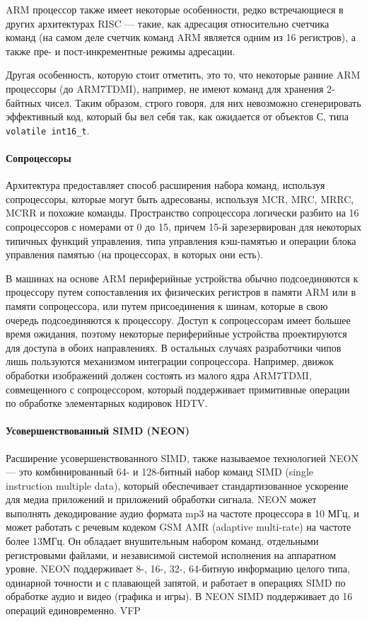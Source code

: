 ARM процессор также имеет некоторые особенности, редко встречающиеся в 
других архитектурах RISC — такие, как адресация относительно счетчика 
команд (на самом деле счетчик команд ARM является одним из 16 регистров), 
а также пре- и пост-инкрементные режимы адресации.

Другая особенность, которую стоит отметить, это то, что некоторые ранние 
ARM процессоры (до ARM7TDMI), например, не имеют команд для хранения 
2-байтных чисел. Таким образом, строго говоря, для них невозможно 
сгенерировать эффективный код, который бы вел себя так, как ожидается от 
объектов С, типа \verb|volatile int16_t|.

\paragraph{Сопроцессоры}

Архитектура предоставляет способ расширения набора команд, используя 
сопроцессоры, которые могут быть адресованы, используя MCR, MRC, MRRC, 
MCRR и похожие команды. Пространство сопроцессора логически разбито на 16 
сопроцессоров с номерами от 0 до 15, причем 15-й зарезервирован для 
некоторых типичных функций управления, типа управления кэш-памятью и 
операции блока управления памятью (на процессорах, в которых они есть).

В машинах на основе ARM периферийные устройства обычно подсоединяются к 
процессору путем сопоставления их физических регистров в памяти ARM или в 
памяти сопроцессора, или путем присоединения к шинам, которые в свою очередь 
подсоединяются к процессору. Доступ к сопроцессорам имеет большее время 
ожидания, поэтому некоторые периферийные устройства проектируются для 
доступа в обоих направлениях. В остальных случаях разработчики чипов лишь 
пользуются механизмом интеграции сопроцессора. Например, движок обработки 
изображений должен состоять из малого ядра ARM7TDMI, совмещенного с 
сопроцессором, который поддерживает примитивные операции по обработке 
элементарных кодировок HDTV.

\paragraph{Усовершенствованный SIMD (NEON)}

Расширение усовершенствованного SIMD, также называемое технологией NEON — это 
комбинированный 64- и 128-битный набор команд SIMD (single instruction 
multiple data), который обеспечивает стандартизованное ускорение для медиа 
приложений и приложений обработки сигнала. NEON может выполнять декодирование 
аудио формата mp3 на частоте процессора в 10 МГц, и может работать с речевым 
кодеком GSM AMR (adaptive multi-rate) на частоте более 13МГц. Он обладает
 внушительным набором команд, отдельными регистровыми файлами, и независимой 
 системой исполнения на аппаратном уровне. NEON поддерживает 8-, 16-, 32-, 
 64-битную информацию целого типа, одинарной точности и с плавающей запятой, 
 и работает в операциях SIMD по обработке аудио и видео (графика и игры).
  В NEON SIMD поддерживает до 16 операций единовременно.
VFP

